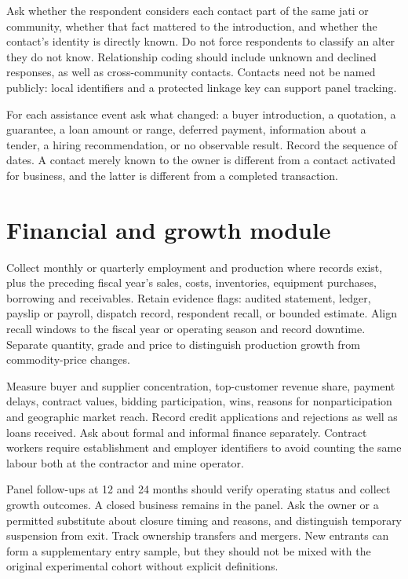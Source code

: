 \documentclass[11pt,a4paper]{report}
\begin{document}
Ask whether the respondent considers each contact part of the same jati or community, whether that fact mattered to the introduction, and whether the contact's identity is directly known. Do not force respondents to classify an alter they do not know. Relationship coding should include unknown and declined responses, as well as cross-community contacts. Contacts need not be named publicly: local identifiers and a protected linkage key can support panel tracking.

For each assistance event ask what changed: a buyer introduction, a quotation, a guarantee, a loan amount or range, deferred payment, information about a tender, a hiring recommendation, or no observable result. Record the sequence of dates. A contact merely known to the owner is different from a contact activated for business, and the latter is different from a completed transaction.

\section{Financial and growth module}
Collect monthly or quarterly employment and production where records exist, plus the preceding fiscal year's sales, costs, inventories, equipment purchases, borrowing and receivables. Retain evidence flags: audited statement, ledger, payslip or payroll, dispatch record, respondent recall, or bounded estimate. Align recall windows to the fiscal year or operating season and record downtime. Separate quantity, grade and price to distinguish production growth from commodity-price changes.

Measure buyer and supplier concentration, top-customer revenue share, payment delays, contract values, bidding participation, wins, reasons for nonparticipation and geographic market reach. Record credit applications and rejections as well as loans received. Ask about formal and informal finance separately. Contract workers require establishment and employer identifiers to avoid counting the same labour both at the contractor and mine operator.

Panel follow-ups at 12 and 24 months should verify operating status and collect growth outcomes. A closed business remains in the panel. Ask the owner or a permitted substitute about closure timing and reasons, and distinguish temporary suspension from exit. Track ownership transfers and mergers. New entrants can form a supplementary entry sample, but they should not be mixed with the original experimental cohort without explicit definitions.
\end{document}
